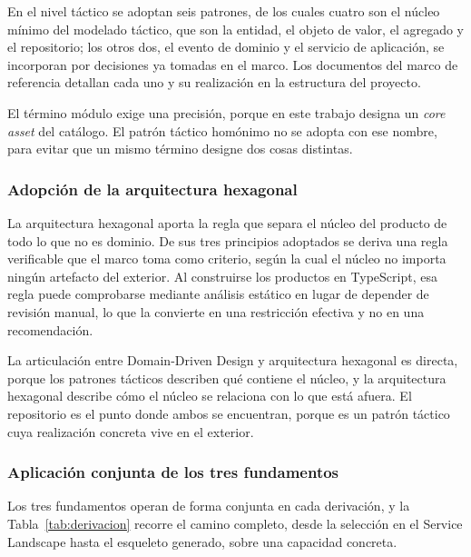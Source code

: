 En el nivel táctico se adoptan seis patrones, de los cuales cuatro son el
núcleo mínimo del modelado táctico, que son la entidad, el objeto de valor, el
agregado y el repositorio; los otros dos, el evento de dominio y el servicio
de aplicación, se incorporan por decisiones ya tomadas en el marco. Los
documentos del marco de referencia detallan cada uno y su realización en la
estructura del proyecto.

El término módulo exige una precisión, porque en este trabajo designa un
\emph{core asset} del catálogo. El patrón táctico homónimo no se adopta con ese
nombre, para evitar que un mismo término designe dos cosas distintas.

\subsubsection*{Adopción de la arquitectura hexagonal}

La arquitectura hexagonal aporta la regla que separa el núcleo del producto
de todo lo que no es dominio. De sus tres principios adoptados se deriva una
regla verificable que el marco toma como criterio, según la cual el núcleo no
importa ningún artefacto del exterior. Al construirse los productos en
TypeScript, esa regla puede comprobarse mediante análisis estático en lugar
de depender de revisión manual, lo que la convierte en una restricción
efectiva y no en una recomendación.

La articulación entre Domain-Driven Design y arquitectura hexagonal es
directa, porque los patrones tácticos describen qué contiene el núcleo, y la
arquitectura hexagonal describe cómo el núcleo se relaciona con lo que está
afuera. El repositorio es el punto donde ambos se encuentran, porque es un
patrón táctico cuya realización concreta vive en el exterior.

\subsubsection*{Aplicación conjunta de los tres fundamentos}

Los tres fundamentos operan de forma conjunta en cada derivación, y la
Tabla~\ref{tab:derivacion} recorre el camino completo, desde la selección en
el Service Landscape hasta el esqueleto generado, sobre una capacidad
concreta.

